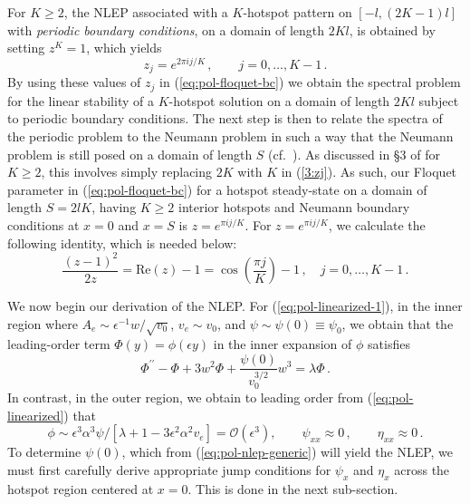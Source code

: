 \documentclass{article}%
\begin{document}
For $K\geq 2$, the NLEP associated with a $K$-hotspot pattern on
$[-l,(2K-1)l]$ with {\em periodic boundary conditions}, on a domain of
length $2Kl$, is obtained by setting $z^K=1$, which yields
\begin{equation}
    z_j = e^{2\pi i j/K} \,, \qquad j=0,\ldots,K-1 \,. \label{3:zj}
\end{equation}
By using these values of $z_j$ in (\ref{eq:pol-floquet-bc}) we obtain
the spectral problem for the linear stability of a $K$-hotspot
solution on a domain of length $2Kl$ subject to periodic boundary
conditions. The next step is then to relate the spectra of the
periodic problem to the Neumann problem in such a way that the Neumann
problem is still posed on a domain of length $S$
(cf.~\cite{kww_crime}). As discussed in \S 3 of \cite{kww_crime} for
$K\geq 2$, this involves simply replacing $2K$ with $K$ in
(\ref{3:zj}).  As such, our Floquet parameter in
(\ref{eq:pol-floquet-bc}) for a hotspot steady-state on a domain of
length $S=2lK$, having $K\geq 2$ interior hotspots and Neumann
boundary conditions at $x=0$ and $x=S$ is $z=e^{\pi i j/K}$. For
$z=e^{\pi i j/K}$, we calculate the following identity, which is
needed below:
\begin{equation}\label{3:ziden}
    \frac{(z-1)^2}{2 z} = \mbox{Re}(z)-1 = 
\cos\left(\frac{\pi j}{K}\right) - 1 \,, \quad j=0,\ldots,K-1 \,.
\end{equation}

We now begin our derivation of the NLEP. For
(\ref{eq:pol-linearized-1}), in the inner region where $A_{e}\sim
\epsilon^{-1} {w/\sqrt{v_0}}$, $v_e\sim v_0$, and $\psi\sim
\psi(0)\equiv \psi_{0}$, we obtain that the leading-order term
$\Phi(y)=\phi(\epsilon y)$ in the inner expansion of $\phi$ satisfies
\begin{equation}
\Phi^{\prime\prime}-\Phi+3w^{2}\Phi+\frac{\psi(0)}{v_{0}^{3/2}}w^{3}=\lambda\Phi\,.
\label{eq:pol-nlep-generic}
\end{equation}
In contrast, in the outer region, we obtain
to leading order from (\ref{eq:pol-linearized}) that 
\begin{equation}
\phi\sim\epsilon^{3}\alpha^{3}\psi/[\lambda+1-3\epsilon^{2}\alpha^{2}v_{e}]=
{\mathcal O}(\epsilon^{3}),\qquad\psi_{xx}\approx 0\,,\qquad\eta_{xx}\approx 0\,.
\label{stab:phi_out}
\end{equation}
To determine $\psi(0)$, which from (\ref{eq:pol-nlep-generic}) will yield 
the NLEP, we must first carefully derive appropriate jump conditions for
$\psi_x$ and $\eta_x$ across the hotspot region centered at $x=0$.
This is done in the next sub-section.
\end{document}
